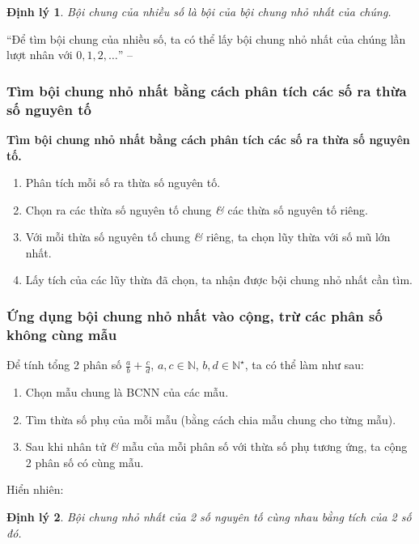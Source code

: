 \documentclass{article}
\numberwithin{equation}{section}
\newtheorem{dinhly}{Định lý}[section]
\begin{document}
\begin{dinhly}
	Bội chung của nhiều số là bội của bội chung nhỏ nhất của chúng.
\end{dinhly}
``Để tìm bội chung của nhiều số, ta có thể lấy bội chung nhỏ nhất của chúng lần lượt nhân với $0,1,2,\ldots$'' -- \cite[p. 55]{SGK_Toan_6_Canh_Dieu_tap_1}

\subsubsection{Tìm bội chung nhỏ nhất bằng cách phân tích các số ra thừa số nguyên tố}

\begin{tcolorbox}
	\textbf{Tìm bội chung nhỏ nhất bằng cách phân tích các số ra thừa số nguyên tố.}
	\begin{enumerate}
		\item Phân tích mỗi số ra thừa số nguyên tố.
		\item Chọn ra các thừa số nguyên tố chung \textit{\&} các thừa số nguyên tố riêng.
		\item Với mỗi thừa số nguyên tố chung \textit{\&} riêng, ta chọn lũy thừa với số mũ lớn nhất.
		\item Lấy tích của các lũy thừa đã chọn, ta nhận được bội chung nhỏ nhất cần tìm.
	\end{enumerate}
\end{tcolorbox}

\subsubsection{Ứng dụng bội chung nhỏ nhất vào cộng, trừ các phân số không cùng mẫu}

\begin{tcolorbox}
	Để tính tổng 2 phân số $\frac{a}{b} + \frac{c}{d}$, $a,c\in\mathbb{N}$, $b,d\in\mathbb{N}^\star$, ta có thể làm như sau:
	\begin{enumerate}
		\item Chọn mẫu chung là BCNN của các mẫu.
		\item Tìm thừa số phụ của mỗi mẫu (bằng cách chia mẫu chung cho từng mẫu).
		\item Sau khi nhân tử \textit{\&} mẫu của mỗi phân số với thừa số phụ tương ứng, ta cộng 2 phân số có cùng mẫu.
	\end{enumerate}
\end{tcolorbox}
Hiển nhiên:

\begin{dinhly}
	Bội chung nhỏ nhất của 2 số nguyên tố cùng nhau bằng tích của 2 số đó.
\end{dinhly}
\end{document}
